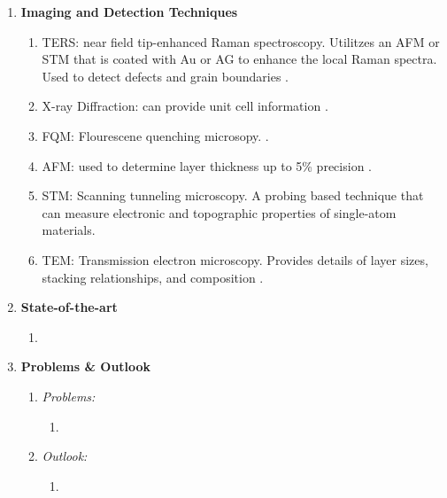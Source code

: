 \documentclass{article}
\begin{document}
\begin{enumerate}
	\item{\textbf{Imaging and Detection Techniques}}
		\begin{enumerate}
			\item{TERS: near field tip-enhanced Raman spectroscopy. Utilitzes an AFM or STM that is coated with Au or AG to enhance the local Raman spectra. Used to detect defects and grain boundaries \cite{acsnanoReview2013}.}
			\item{X-ray Diffraction: can provide unit cell information \cite{acsnanoReview2013}.}
			\item{FQM: Flourescene quenching microsopy. \cite{acsnanoReview2013}.}
			\item{AFM: used to determine layer thickness up to 5\% precision \cite{acsnanoReview2013, Fukuda2008, Osada2011}.}
			\item{STM: Scanning tunneling microscopy. A probing based technique that can measure electronic and topographic properties of single-atom materials. }
			\item{TEM: Transmission electron microscopy. Provides details of layer sizes, stacking relationships, and composition \cite{acsnanoReview2013}.}
		\end{enumerate}


	\item{\textbf{State-of-the-art}}
		\begin{enumerate} %
			\item{}
		\end{enumerate}	%

	\item{\textbf{Problems \& Outlook}}
		\begin{enumerate}	%
			\item{\textit{Problems:}}
				\begin{enumerate}
					\item{}
				\end{enumerate}
			\item{\textit{Outlook:}}
				\begin{enumerate}
					\item{}
				\end{enumerate}
		\end{enumerate} %
\end{enumerate} %



\end{document}
